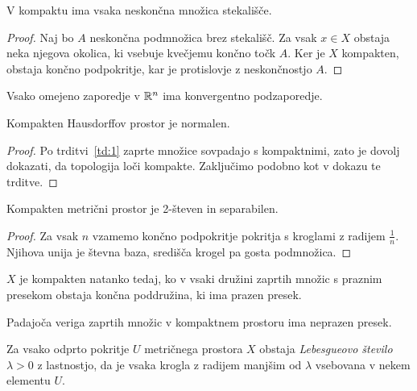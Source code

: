 \begin{trditev}
V kompaktu ima vsaka neskončna množica stekališče.
\end{trditev}

\begin{proof}
Naj bo $A$ neskončna podmnožica brez stekališč. Za vsak $x \in X$
obstaja neka njegova okolica, ki vsebuje kvečjemu končno točk $A$.
Ker je $X$ kompakten, obstaja končno podpokritje, kar je
protislovje z neskončnostjo $A$.
\end{proof}

\begin{posledica}
Vsako omejeno zaporedje v $\mathbb{R}^n$ ima konvergentno podzaporedje.
\end{posledica}

\obvs

\begin{izrek}
Kompakten Hausdorffov prostor je normalen.
\end{izrek}

\begin{proof}
Po trditvi~\ref{td:1} zaprte množice sovpadajo s kompaktnimi, zato
je dovolj dokazati, da topologija loči kompakte. Zaključimo podobno
kot v dokazu te trditve.
\end{proof}

\begin{izrek}
Kompakten metrični prostor je 2-števen in separabilen.
\end{izrek}

\begin{proof}
Za vsak $n$ vzamemo končno podpokritje pokritja s kroglami z
radijem $\frac{1}{n}$. Njihova unija je števna baza, središča
krogel pa gosta podmnožica.
\end{proof}

\begin{trditev}
$X$ je kompakten natanko tedaj, ko v vsaki družini zaprtih množic
s praznim presekom obstaja končna poddružina, ki ima prazen presek.
\end{trditev}

\obvs

\begin{izrek}[Cantor]
Padajoča veriga zaprtih množic v kompaktnem prostoru ima neprazen
presek.
\end{izrek}

\obvs

\begin{lema}[Lebesgue]
Za vsako odprto pokritje $U$ metričnega prostora $X$ obstaja
\emph{Lebesgueovo število} $\lambda>0$ z lastnostjo, da je vsaka
krogla z radijem manjšim od $\lambda$ vsebovana v nekem elementu
$U$.
\end{lema}

